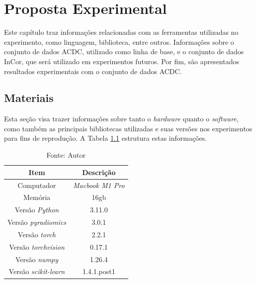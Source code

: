 \chapter{Proposta Experimental}
\label{chap:proposta_experimental}

Este capítulo traz informações relacionadas com as ferramentas utilizadas no experimento, como linguagem, biblioteca, entre outros. Informações sobre o conjunto de dados \gls{ACDC}, utilizado como linha de base, e o conjunto de dados \gls{InCor}, que será utilizado em experimentos futuros. Por fim, são apresentados resultados experimentais com o conjunto de dados \gls{ACDC}. 

\section{Materiais} 
\label{sec:cap5_materiais}

Esta seção visa trazer informações sobre tanto o \textit{hardware} quanto o \textit{software}, como também as principais bibliotecas utilizadas e suas versões nos experimentos para fins de reprodução. A Tabela \ref{tab:hardware_software} estrutura estas informações.

\begin{table}[hbtp]
    \centering
    \renewcommand{\arraystretch}{1} %
    \begin{tabular}{|c|c|}
    \hline 
       \textbf{Item} & \textbf{Descrição}\\
    \hline 
       Computador & \textit{Macbook M1 Pro}  \\
    \hline 
       Memória & 16gb  \\
    \hline 
       Versão \textit{Python} & 3.11.0  \\
    \hline 
       Versão \textit{pyradiomics} & 3.0.1 \\
    \hline 
       Versão \textit{torch} & 2.2.1 \\
    \hline 
       Versão \textit{torchvision} & 0.17.1 \\
    \hline 
       Versão \textit{numpy} & 1.26.4 \\
    \hline 
       Versão \textit{scikit-learn} & 1.4.1.post1 \\
    \hline 
    \end{tabular} 
    \caption{Fonte: Autor}
    \label{tab:hardware_software}
\end{table}


